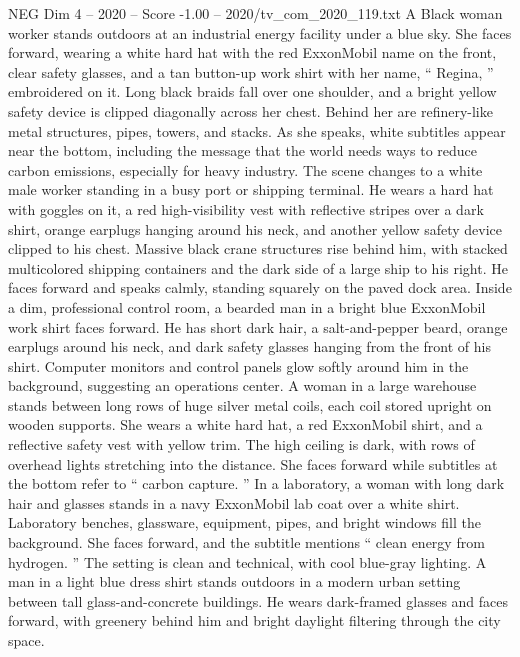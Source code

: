 \begin{textsample}{NEG Dim 4 – 2020 – Score -1.00 – 2020/tv\_com\_2020\_119.txt}  \label{ex:f4_neg_084}
A Black woman worker stands outdoors at an industrial energy facility under a blue sky.
She faces forward, wearing a white hard hat with the red ExxonMobil name on the front, clear safety glasses, and a tan button-up work shirt with her name, “ Regina, ” embroidered on it.
Long black braids fall over one shoulder, and a bright yellow safety device is clipped diagonally across her chest.
Behind her are refinery-like metal structures, pipes, towers, and stacks.
As she speaks, white subtitles appear near the bottom, including the message that the world needs ways to reduce carbon emissions, especially for heavy industry.
The scene changes to a white male worker standing in a busy port or shipping terminal.
He wears a hard hat with goggles on it, a red high-visibility vest with reflective stripes over a dark shirt, orange earplugs hanging around his neck, and another yellow safety device clipped to his chest.
Massive black crane structures rise behind him, with stacked multicolored shipping containers and the dark side of a large ship to his right.
He faces forward and speaks calmly, standing squarely on the paved dock area.
Inside a dim, professional control room, a bearded man in a bright blue ExxonMobil work shirt faces forward.
He has short dark hair, a salt-and-pepper beard, orange earplugs around his neck, and dark safety glasses hanging from the front of his shirt.
Computer monitors and control panels glow softly around him in the background, suggesting an operations center.
A woman in a large warehouse stands between long rows of huge silver metal coils, each coil stored upright on wooden supports.
She wears a white hard hat, a red ExxonMobil shirt, and a reflective safety vest with yellow trim.
The high ceiling is dark, with rows of overhead lights stretching into the distance.
She faces forward while subtitles at the bottom refer to “ carbon capture. ” In a laboratory, a woman with long dark hair and glasses stands in a navy ExxonMobil lab coat over a white shirt.
Laboratory benches, glassware, equipment, pipes, and bright windows fill the background.
She faces forward, and the subtitle mentions “ clean energy from hydrogen. ” The setting is clean and technical, with cool blue-gray lighting.
A man in a light blue dress shirt stands outdoors in a modern urban setting between tall glass-and-concrete buildings.
He wears dark-framed glasses and faces forward, with greenery behind him and bright daylight filtering through the city space.

\end{textsample}
